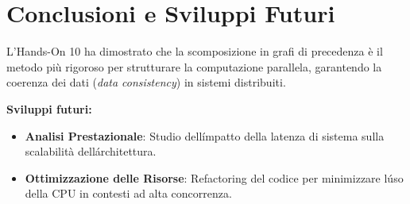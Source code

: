 \documentclass[a4paper,12pt]{article}
\begin{document}
\section{Conclusioni e Sviluppi Futuri}
L'Hands-On 10 ha dimostrato che la scomposizione in grafi di precedenza è il metodo più rigoroso per strutturare la computazione parallela, garantendo la coerenza dei dati (\textit{data consistency}) in sistemi distribuiti.

\noindent \textbf{Sviluppi futuri:}
\begin{itemize}
    \item \textbf{Analisi Prestazionale}: Studio dell\'impatto della latenza di sistema sulla scalabilità dell\'architettura.
    \item \textbf{Ottimizzazione delle Risorse}: Refactoring del codice per minimizzare l\'uso della CPU in contesti ad alta concorrenza.
\end{itemize}
\end{document}
